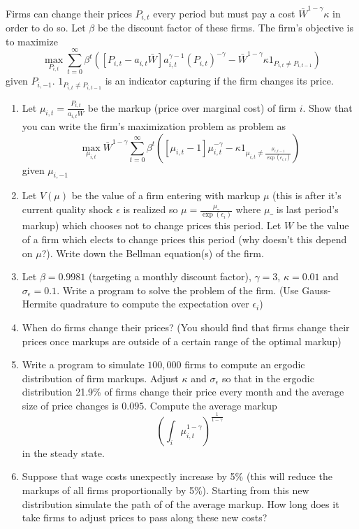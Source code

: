 \documentclass{exam}
\begin{document}
 Firms can change their prices $P_{i,t}$ every period but must pay a cost $\bar W^{1-\gamma}\kappa$ in order to do so.  Let $\beta$ be the discount factor of these firms. The firm's objective is to maximize
 \begin{equation}
 	\max_{P_{i,t}} \sum_{t=0}^\infty \beta^t\left([P_{i,t}-a_{i,t}\bar W]a_{i,t}^{\gamma-1}\left(P_{i,t}\right)^{-\gamma}-\bar W^{1-\gamma}\kappa1_{P_{i,t}\neq P_{i,t-1}}\right)
 \end{equation}given $P_{i,-1}$. $1_{P_{i,t}\neq P_{i,t-1}}$ is an indicator capturing if the firm changes its price.  
 \begin{enumerate}
 	\item Let $\mu_{i,t}=\frac{P_{i,t}}{a_{i,t}\bar W}$ be the markup (price over marginal cost) of firm $i$.  Show that you can write the firm's maximization problem as problem as 
 	\begin{equation}
 		\max_{\mu_{i,t}}\bar W^{1-\gamma}\sum_{t=0}^\infty \beta^t\left([\mu_{i,t}-1]\mu_{i,t}^{-\gamma}-\kappa1_{\mu_{i,t}\neq \frac{\mu_{i,t-1}}{\exp(\epsilon_{i,t})}}\right)
 	\end{equation}given $\mu_{i,-1}$
 	\item  Let $V(\mu)$ be the value of a firm entering with markup $\mu$ (this is after it's current quality shock $\epsilon$ is realized so $\mu=\frac{\mu\_}{\exp(\epsilon_i)}$ where $\mu\_$ is last period's markup) which chooses not to change prices this period.  Let $W$ be the value of a firm which elects to change prices this period (why doesn't this depend on $\mu$?).  Write down the Bellman equation(s) of the firm.
 	\item  Let $\beta=0.9981$ (targeting a monthly discount factor), $\gamma =3$, $\kappa =0.01$ and $\sigma_\epsilon = 0.1$.  Write a program to solve the problem of the firm. (Use Gauss-Hermite quadrature to compute the expectation over $\epsilon_i$)
 	\item  When do firms change their prices? (You should find that firms change their prices once markups are outside of a certain range of the optimal markup)
 	\item  Write a program to simulate $100,000$ firms to compute an ergodic distribution of firm markups.  Adjust $\kappa$ and $\sigma_\epsilon$ so that in the ergodic distribution 21.9\% of firms change their price every month and the average size of price changes is $0.095$. Compute the average markup
 	\begin{equation*}
 		\left(\int_i\mu_{i,t}^{1-\gamma}\right)^\frac1{1-\gamma}
 	\end{equation*}in the steady state.
 	\item  Suppose that wage costs unexpectly increase by 5\% (this will reduce the markups of all firms proportionally by 5\%).  Starting from this new distribution simulate the path of of the average markup.  How long does it take firms to adjust prices to pass along these new costs?
 \end{enumerate}
\end{document}
